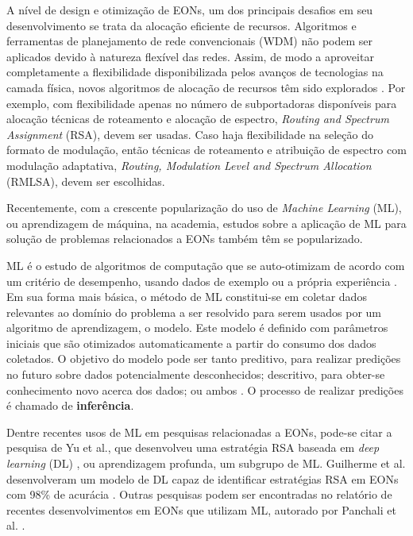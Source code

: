 A nível de design e otimização de EONs, um dos principais desafios em seu desenvolvimento se trata da alocação eficiente de recursos. Algoritmos e ferramentas de planejamento de rede convencionais (WDM) não podem ser aplicados devido à natureza flexível das redes. Assim, de modo a aproveitar completamente a flexibilidade disponibilizada pelos avanços de tecnologias na camada física, novos algoritmos de alocação de recursos têm sido explorados \cite{eon_tutorial_2014, eon_allocation_2011, eon_allocation_2011_2, eon_allocation_2016, eon_allocation_2017}. Por exemplo, com flexibilidade apenas no número de subportadoras disponíveis para alocação técnicas de roteamento e alocação de espectro, \textit{Routing and Spectrum Assignment} (RSA), devem ser usadas. Caso haja flexibilidade na seleção do formato de modulação, então técnicas de roteamento e atribuição de espectro com modulação adaptativa, \textit{Routing, Modulation Level and Spectrum Allocation} (RMLSA), devem ser escolhidas.

Recentemente, com a crescente popularização do uso de \textit{Machine Learning} (ML), ou aprendizagem de máquina, na academia, estudos sobre a aplicação de ML para solução de problemas relacionados a EONs também têm se popularizado.

ML é o estudo de algoritmos de computação que se auto-otimizam de acordo com um critério de desempenho, usando dados de exemplo ou a própria experiência \cite{mitchell1997ml, alpaydin2020introduction}. Em sua forma mais básica, o método de ML constitui-se em coletar dados relevantes ao domínio do problema a ser resolvido para serem usados por um algoritmo de aprendizagem, o modelo. Este modelo é definido com parâmetros iniciais que são otimizados automaticamente a partir do consumo dos dados coletados. O objetivo do modelo pode ser tanto preditivo, para realizar predições no futuro sobre dados potencialmente desconhecidos; descritivo, para obter-se conhecimento novo acerca dos dados; ou ambos \cite{alpaydin2020introduction, brief_introduction_to_ml}. O processo de realizar predições é chamado de \textbf{inferência}.

Dentre recentes usos de ML em pesquisas relacionadas a EONs, pode-se citar a pesquisa de Yu et al., que desenvolveu uma estratégia RSA baseada em \textit{deep learning} (DL) \cite{eon_ml_rsa_dl_2019}, ou aprendizagem profunda, um subgrupo de ML. Guilherme et al. desenvolveram um modelo de DL capaz de identificar estratégias RSA em EONs com 98\% de acurácia \cite{eon_ml_classifier_2020}. Outras pesquisas podem ser encontradas no relatório de recentes desenvolvimentos em EONs que utilizam ML, autorado por Panchali et al. \cite{eon_ml_recent_2019}.

